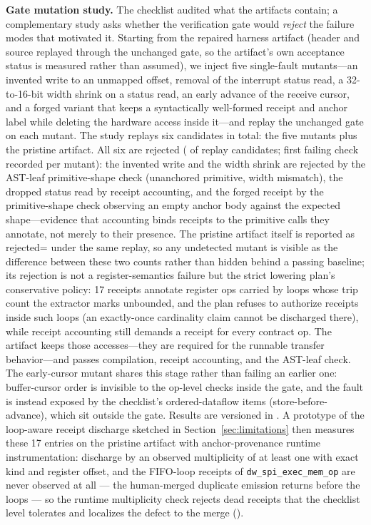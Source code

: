 \textbf{Gate mutation study.} The checklist audited what the artifacts
contain; a complementary study asks whether the verification gate would
\emph{reject} the failure modes that motivated it. Starting from the
repaired harness artifact (header and source replayed through the
unchanged gate, so the artifact's own acceptance status is measured rather
than assumed), we inject five single-fault mutants---an invented write to
an unmapped offset, removal of the interrupt status read, a 32-to-16-bit
width shrink on a status read, an early advance of the receive cursor, and
a forged variant that keeps a syntactically well-formed receipt and anchor
label while deleting the hardware access inside it---and replay the
unchanged gate on each mutant. The study replays six candidates in
total: the five mutants plus the pristine artifact. All six are rejected
(\GateMutationsRejected{} of \GateMutationsApplied{} replay candidates;
first failing check recorded
per mutant): the invented write and the width shrink are rejected by the
AST-leaf primitive-shape check (unanchored primitive, width mismatch), the
dropped status read by receipt accounting, and the forged receipt by the
primitive-shape check observing an empty anchor body against the expected
shape---evidence that accounting binds receipts to the primitive calls
they annotate, not merely to their presence. The pristine artifact itself
is reported as rejected=\GatePristineRejected{} under the same replay, so
any undetected mutant is visible as the difference between these two
counts rather than hidden behind a passing baseline; its rejection is not
a register-semantics failure but the strict lowering plan's conservative
policy: 17 receipts annotate register ops carried by loops whose trip
count the extractor marks unbounded, and the plan refuses to authorize
receipts inside such loops (an exactly-once cardinality claim cannot be
discharged there), while receipt accounting still demands a receipt for
every contract op. The artifact keeps those accesses---they are required
for the runnable transfer behavior---and passes compilation, receipt
accounting, and the AST-leaf check. The early-cursor mutant shares this
stage rather than failing an earlier one: buffer-cursor order is invisible
to the op-level checks inside the gate, and the fault is instead exposed
by the checklist's ordered-dataflow items (store-before-advance), which
sit outside the gate. Results are versioned in
. A
prototype of the loop-aware receipt discharge sketched in
Section~\ref{sec:limitations} then measures these 17 entries on the pristine
artifact with anchor-provenance runtime instrumentation: \LoopAwareDischarged{}
discharge by an
observed multiplicity of at least one with exact kind and register offset,
and the \LoopAwareUnobserved{} FIFO-loop receipts of \texttt{dw\_spi\_exec\_mem\_op} are never
observed at all --- the human-merged duplicate emission returns before the
loops --- so the runtime multiplicity check rejects dead receipts that the
checklist level tolerates and localizes the defect to the merge
().


